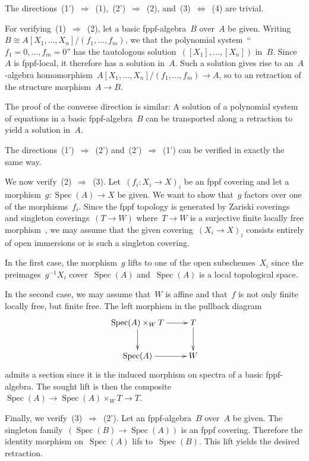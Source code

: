 \documentclass[10pt,reqno,a4paper]{amsbook}
\makeatletter
\theoremstyle{definition}
\theoremstyle{plain}
\theoremstyle{remark}
\DeclareMathOperator{\Spec}{Spec}
\newcommand{\?}{\,{:}\,}
\renewcommand{\_}{\mathpunct{.}\,}
\newcommand{\stacksproject}[1]{\cite[{\href{http://stacks.math.columbia.edu/tag/#1}{Tag~#1}}]{stacks-project}}
\renewenvironment{proof}[1][\proofname]{\par
  \pushQED{\qed}%
  \normalfont \topsep6\p@\@plus6\p@\relax
  \trivlist
  \item[\hskip\labelsep
        \itshape
    #1\@addpunct{.}]\ignorespaces
}{%
  \popQED\endtrivlist\@endpefalse
}
\makeatother
\begin{document}
\begin{proof}The directions~(1')~$\Rightarrow$~(1),~(2')~$\Rightarrow$~(2),
and~(3)~$\Leftrightarrow$~(4) are trivial.

For verifying~(1)~$\Rightarrow$~(2), let a basic fppf-algebra~$B$ over~$A$ be
given. Writing~$B \cong A[X_1,\ldots,X_n]/(f_1,\ldots,f_m)$, we that the
polynomial system~``$f_1 = 0, \ldots, f_m = 0$'' has the tautologous
solution~$([X_1],\ldots,[X_n])$ in~$B$. Since~$A$ is fppf-local, it therefore
has a solution in~$A$. Such a solution gives rise to an~$A$-algebra
homomorphism~$A[X_1,\ldots,X_n]/(f_1,\ldots,f_m) \to A$, so to an retraction of
the structure morphism~$A \to B$.

The proof of the converse direction is similar: A solution of a polynomial
system of equations in a basic fppf-algebra~$B$ can be transported along a
retraction to yield a solution in~$A$.

The directions~(1')~$\Rightarrow$~(2') and~(2')~$\Rightarrow$~(1') can be
verified in exactly the same way.

We now verify~(2)~$\Rightarrow$~(3). Let~$(f_i : X_i \to X)_i$ be an fppf
covering and let a morphism~$g : \Spec(A) \to X$ be given. We want to show
that~$g$ factors over one of the morphisms~$f_i$. Since the fppf topology is
generated by Zariski coverings and singleton coverings~$(T \to W)$ where~$T \to
W$ is a surjective finite locally free morphism~\stacksproject{05WN}, we may
assume that the given covering~$(X_i \to X)_i$ consists entirely of open
immersions or is such a singleton covering.

In the first case, the morphism~$g$ lifts to one of the open subschemes~$X_i$
since the preimages~$g^{-1}X_i$ cover~$\Spec(A)$ and~$\Spec(A)$ is a local
topological space.

In the second case, we may assume that~$W$ is affine and that~$f$ is not only
finite locally free, but finite free. The left morphism in the pullback diagram
\[ \xymatrix{
  \Spec(A) \times_W T \ar[r]\ar[d] & T \ar[d] \\
  \Spec(A) \ar[r] & W
} \]
admits a section since it is the induced morphism on spectra of a basic
fppf-algebra. The sought lift is then the composite~$\Spec(A) \to \Spec(A)
\times_W T \to T$.

Finally, we verify~(3)~$\Rightarrow$~(2'). Let an fppf-algebra~$B$ over~$A$ be
given. The singleton family~$(\Spec(B) \to \Spec(A))$ is an fppf covering.
Therefore the identity morphism on~$\Spec(A)$ lifs to~$\Spec(B)$. This lift
yields the desired retraction.
\end{proof}
\end{document}

